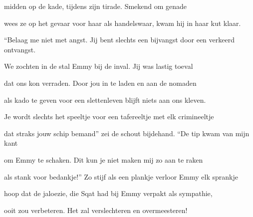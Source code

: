midden op de kade,
tijdens zijn tirade.
Smekend om genade

wees ze op het gevaar
voor haar als handelswaar,
kwam hij in haar kut klaar.

“Belaag me niet met angst.
Jij bent slechts een bijvangst
door een verkeerd ontvangst.

We zochten in de stal
Emmy bij de inval.
Jij was lastig toeval

dat ons kon verraden.
Door jou in te laden
en aan de nomaden

als kado te geven
voor een slettenleven
blijft niets aan ons kleven.

Je wordt slechts het speeltje
voor een tafereeltje
met elk crimineeltje

dat straks jouw schip bemand”
zei de schout bijdehand.
“De tip kwam van mijn kant

om Emmy te schaken.
Dit kun je niet maken
mij zo aan te raken

als stank voor bedankje!”
Zo stijf als een plankje
verloor Emmy elk sprankje

hoop dat de jaloezie,
die Sqat had bij Emmy
verpakt als sympathie,

ooit zou verbeteren.
Het zal verslechteren
en overmeesteren!
